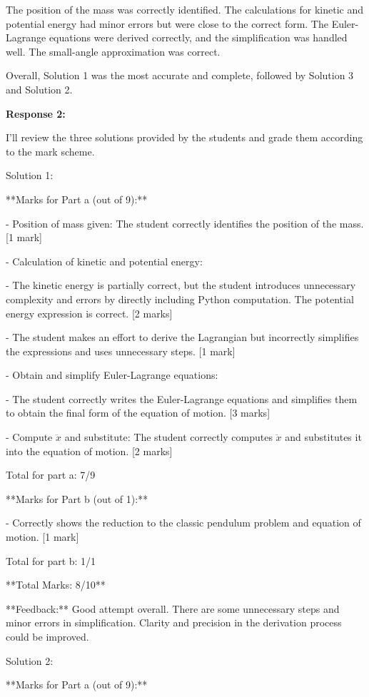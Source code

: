 \documentclass[a4paper,11pt]{article}
\begin{document}
The position of the mass was correctly identified. The calculations for kinetic and potential energy had minor errors but were close to the correct form. The Euler-Lagrange equations were derived correctly, and the simplification was handled well. The small-angle approximation was correct.

Overall, Solution 1 was the most accurate and complete, followed by Solution 3 and Solution 2.

\bigskip
\textbf{Response 2:}

I'll review the three solutions provided by the students and grade them according to the mark scheme.

Solution 1:

**Marks for Part a (out of 9):**

- Position of mass given: The student correctly identifies the position of the mass. [1 mark]

- Calculation of kinetic and potential energy: 
  
  - The kinetic energy is partially correct, but the student introduces unnecessary complexity and errors by directly including Python computation. The potential energy expression is correct. [2 marks]
  
  - The student makes an effort to derive the Lagrangian but incorrectly simplifies the expressions and uses unnecessary steps. [1 mark]

- Obtain and simplify Euler-Lagrange equations: 
  
  - The student correctly writes the Euler-Lagrange equations and simplifies them to obtain the final form of the equation of motion. [3 marks]

- Compute \( \ddot{x} \) and substitute: The student correctly computes \( \ddot{x} \) and substitutes it into the equation of motion. [2 marks]

Total for part a: 7/9

**Marks for Part b (out of 1):**

- Correctly shows the reduction to the classic pendulum problem and equation of motion. [1 mark]

Total for part b: 1/1

**Total Marks: 8/10**

**Feedback:** Good attempt overall. There are some unnecessary steps and minor errors in simplification. Clarity and precision in the derivation process could be improved.

Solution 2:

**Marks for Part a (out of 9):**
\end{document}
